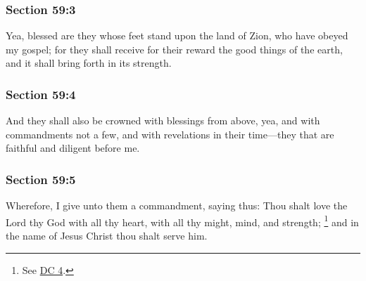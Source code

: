 	\subsubsection{Section 59:3} %
		\label{DC59-3}

		Yea, blessed are they whose feet stand upon the land of Zion, who have obeyed my gospel; for they shall receive for their reward the good things of the earth, and it shall bring forth in its strength.


	\subsubsection{Section 59:4} %
		\label{DC59-4}

		And they shall also be crowned with blessings from above, yea, and with commandments not a few, and with revelations in their time---they that are faithful and diligent before me.


	\subsubsection{Section 59:5} %
		\label{DC59-5}

		Wherefore, I give unto them a commandment, saying thus: Thou shalt love the Lord thy God with all thy heart, with all thy might, mind, and strength;%
			\footnote{%
				See \hyperref[DC4]{DC 4}.
				}
		and in the name of Jesus Christ thou shalt serve him.


